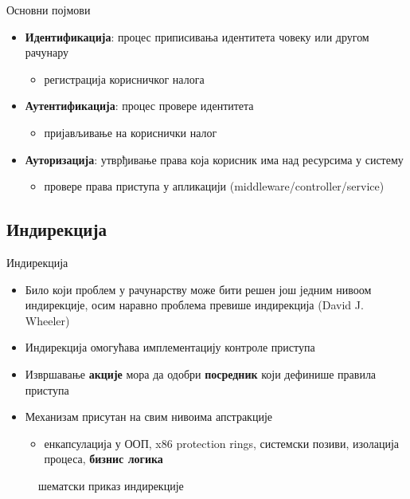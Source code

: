 \documentclass[aspectratio=169]{beamer}
\begin{document}
    \begin{frame}{Основни појмови}
        \begin{itemize}
            \item \textbf{Идентификација}: процес приписивања идентитета човеку или другом рачунару
            \begin{itemize}
                \item регистрација корисничког налога
            \end{itemize}
            \item \textbf{Аутентификација}: процес провере идентитета
            \begin{itemize}
                \item пријављивање на кориснички налог
            \end{itemize}
            \item \textbf{Ауторизација}: утврђивање права која корисник има над ресурсима у систему
            \begin{itemize}
                \item провере права приступа у апликацији (middleware/controller/service)
            \end{itemize}
        \end{itemize}
    \end{frame}
    
    \subsection[]{Индирекција}
    
    \begin{frame}[allowframebreaks]{Индирекција}
        \begin{itemize}
            \item Било који проблем у рачунарству може бити решен још једним нивоом индирекције, осим наравно проблема превише индирекција (David J. Wheeler)
            \item Индирекција омогућава имплементацију контроле приступа
            \item Извршавање \textbf{акције} мора да одобри \textbf{посредник} који дефинише правила приступа
            \item Механизам присутан на свим нивоима апстракције
            \begin{itemize}
                \item енкапсулација у ООП, x86 protection rings, системски позиви, изолација процеса, \textbf{бизнис логика}
            \end{itemize}
        \end{itemize}
        
        \framebreak
        
        \begin{figure}
            \centering
            \caption{шематски приказ индирекције}
            \label{fig:indirection}
        \end{figure}
    \end{frame}
    
\end{document}
